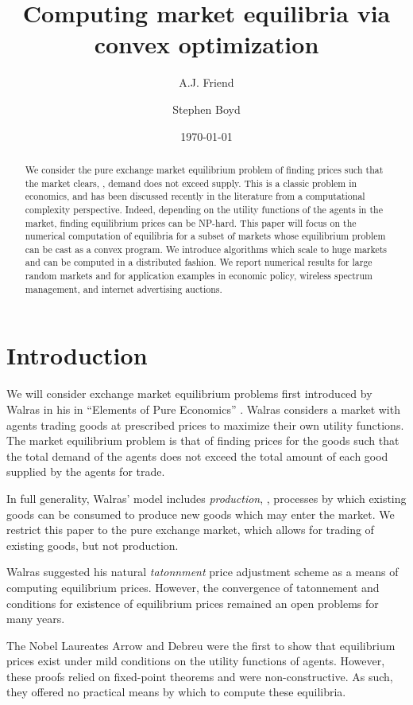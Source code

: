 \documentclass[12pt]{article}
\title{Computing market equilibria via convex optimization}
\author{A.J. Friend \and Stephen Boyd}
\date{\today}
\begin{document}
\maketitle

\begin{abstract}
We consider the pure exchange market equilibrium problem of finding prices
such that the market clears, \ie, demand does not exceed supply.
This is a classic problem in economics, and has been discussed recently
in the literature from a computational complexity perspective.
Indeed, depending on the utility functions of the agents in the market,
finding equilibrium prices can be NP-hard.
This paper will focus on the numerical computation
of equilibria for a subset of markets whose equilibrium
problem can be cast as a convex program.
We introduce algorithms which scale to huge markets and can be computed
in a distributed fashion.
We report numerical results for large random markets and for
application examples in economic policy, wireless spectrum management,
and internet advertising auctions.
\end{abstract}

\newpage
\tableofcontents
\newpage
\listoftodos
\newpage

\section{Introduction}
We will consider exchange market equilibrium problems first introduced by
Walras in his in ``Elements of Pure Economics''
\cite{walras1896elements}.
Walras considers a market with agents trading
goods at prescribed prices to maximize their own utility functions.
The market equilibrium problem is that of finding prices for the goods
such that the total demand of the agents does not exceed the total amount
of each good supplied by the agents for trade.

In full generality, Walras' model includes \emph{production}, \ie, processes by which existing goods can be consumed to produce new goods which may enter the market.
We restrict this paper to the pure exchange market, which allows for trading of existing goods, but not production.

Walras suggested his natural \emph{tatonnment} price adjustment scheme as a means of computing equilibrium prices.
However, the convergence of tatonnement and conditions for existence of equilibrium prices remained an open problems for many years.

The Nobel Laureates Arrow and Debreu were the first to show that equilibrium
prices exist under mild conditions on the utility functions of agents\cite{arrow1954existence}.
However, these proofs relied on fixed-point theorems and were non-constructive.
As such, they offered no practical means by which to compute these equilibria.
\end{document}

